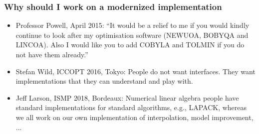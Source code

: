 \documentclass[slidestop,mathserif,xcolor=dvipsnames]{beamer}
\begin{document}
\begin{frame}
    \frametitle{Why should \textbf{\textrm{I}} work on a modernized implementation}

            \vspace{2ex}
    \begin{itemize}
        \item Professor Powell, April 2015: ``It would be a relief to me if you would kindly continue
            to look after my optimisation software (NEWUOA, BOBYQA and LINCOA). Also I would like
            you to add COBYLA and TOLMIN if you do not have them already.''
            \vspace{1ex}
        \item Stefan Wild, ICCOPT 2016, Tokyo: People do not want interfaces. They want
            implementations that they can understand and play with.
            \vspace{1ex}
        \item Jeff Larson, ISMP 2018, Bordeaux: Numerical linear algebra people have standard
            implementations for standard algorithms, e.g., LAPACK, whereas we all work on our own
            implementation of interpolation, model improvement, ...
    \end{itemize}
\end{frame}
\end{document}
